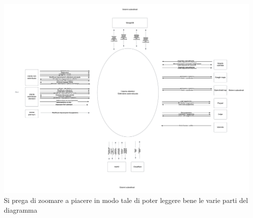 \begin{listaPersonale}[DCO]{}
    \begin{center}
        \includegraphics[width=1\textwidth]{img/Diagrammi/Contesto/DiagrammaContesto.png}
        Si prega di zoomare a piacere in modo tale di poter leggere bene le varie parti del diagramma
    \end{center}

\end{listaPersonale}